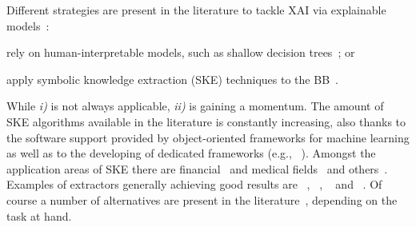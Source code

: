\documentclass[sigconf]{acmart}
\begin{document}
Different strategies are present in the literature to tackle XAI via explainable models~\cite{guidotti2018survey}:
%
\begin{inlinelist}
	\item rely on human-interpretable models, such as shallow decision trees~\cite{Rudin2019}; or
	\item apply symbolic knowledge extraction (SKE) techniques to the BB~\cite{KENNY2021103459}.
\end{inlinelist}
%
While \textit{i)} is not always applicable, \textit{ii)} is gaining a momentum. The amount of SKE algorithms available in the literature is constantly increasing, also thanks to the software support provided by object-oriented frameworks for machine learning 
as well as to the developing of dedicated frameworks (e.g., \psyke{}~\cite{psyke-woa2021,psyke-ia2022,psyke-extraamas2022}).
%
%
Amongst the application areas of SKE there are financial~\cite{baesens2001building,baesens2003using,steiner2006using} and medical fields~\cite{bologna1997three,franco2007early,hayashi2000comparison} and others~\cite{setiono2011rule,sabbatini22LPFSKE,azcarraga2012keyword,hofmann2003rule}.
%
Examples of extractors generally achieving good results are \cart{}~\cite{breiman1984classification}, \trepan{}~\cite{craven1996extracting}, \gridex{}~\cite{gridex-extraamas2021} and \gridrex{}~\cite{gridrex-kr2022}.
%
Of course a number of alternatives are present in the literature~\cite{craven1994using,huysmans2006iter,barakat2005eclectic,martens2007comprehensible}, depending on the task at hand.
\end{document}
